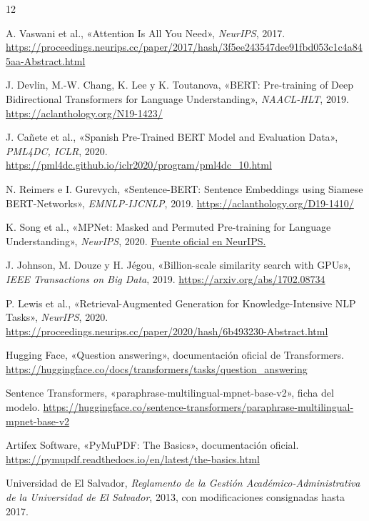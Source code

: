 \documentclass[12pt,letterpaper]{article}
\begin{document}
\renewcommand{\refname}{17.\quad Referencias bibliográficas}
\begin{thebibliography}{12}
\small

A. Vaswani et al., «Attention Is All You Need», \textit{NeurIPS}, 2017.
\url{https://proceedings.neurips.cc/paper/2017/hash/3f5ee243547dee91fbd053c1c4a845aa-Abstract.html}

J. Devlin, M.-W. Chang, K. Lee y K. Toutanova, «BERT: Pre-training of Deep
Bidirectional Transformers for Language Understanding», \textit{NAACL-HLT},
2019. \url{https://aclanthology.org/N19-1423/}

J. Cañete et al., «Spanish Pre-Trained BERT Model and Evaluation Data»,
\textit{PML4DC, ICLR}, 2020.
\url{https://pml4dc.github.io/iclr2020/program/pml4dc_10.html}

N. Reimers e I. Gurevych, «Sentence-BERT: Sentence Embeddings using Siamese
BERT-Networks», \textit{EMNLP-IJCNLP}, 2019.
\url{https://aclanthology.org/D19-1410/}

K. Song et al., «MPNet: Masked and Permuted Pre-training for Language
Understanding», \textit{NeurIPS}, 2020.
\href{https://proceedings.neurips.cc/paper/2020/hash/c3a690be93aa602ee2dc0ccab5b7b67e-Abstract.html}
{Fuente oficial en NeurIPS.}

J. Johnson, M. Douze y H. Jégou, «Billion-scale similarity search with
GPUs», \textit{IEEE Transactions on Big Data}, 2019.
\url{https://arxiv.org/abs/1702.08734}

P. Lewis et al., «Retrieval-Augmented Generation for Knowledge-Intensive NLP
Tasks», \textit{NeurIPS}, 2020.
\url{https://proceedings.neurips.cc/paper/2020/hash/6b493230-Abstract.html}

Hugging Face, «Question answering», documentación oficial de Transformers.
\url{https://huggingface.co/docs/transformers/tasks/question_answering}

Sentence Transformers, «paraphrase-multilingual-mpnet-base-v2», ficha del
modelo. \url{https://huggingface.co/sentence-transformers/paraphrase-multilingual-mpnet-base-v2}

Artifex Software, «PyMuPDF: The Basics», documentación oficial.
\url{https://pymupdf.readthedocs.io/en/latest/the-basics.html}

Universidad de El Salvador, \textit{Reglamento de la Gestión
Académico-Administrativa de la Universidad de El Salvador}, 2013, con
modificaciones consignadas hasta 2017.

\end{thebibliography}
\end{document}
